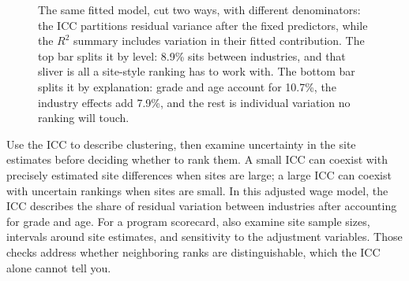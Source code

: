 \documentclass[
    a4paper,
    fontsize=10pt,
    twoside=true,
    numbers=noenddot,
]{kaobook}
\begin{document}
\begin{figure}[htbp]
\centering
{}
\caption[Two reads of the same wage variance]{The same fitted model, cut two ways, with different denominators: the ICC partitions residual variance after the fixed predictors, while the $R^2$ summary includes variation in their fitted contribution. The top bar splits it by level: 8.9\% sits between industries, and that sliver is all a site-style ranking has to work with. The bottom bar splits it by explanation: grade and age account for 10.7\%, the industry effects add 7.9\%, and the rest is individual variation no ranking will touch.}
\label{fig:ch07-viz-varsplit}
\end{figure}

Use the ICC to describe clustering, then examine uncertainty in the site estimates before deciding whether to rank them. A small ICC can coexist with precisely estimated site differences when sites are large; a large ICC can coexist with uncertain rankings when sites are small. In this adjusted wage model, the ICC describes the share of residual variation between industries after accounting for grade and age. For a program scorecard, also examine site sample sizes, intervals around site estimates, and sensitivity to the adjustment variables. Those checks address whether neighboring ranks are distinguishable, which the ICC alone cannot tell you.
\end{document}
